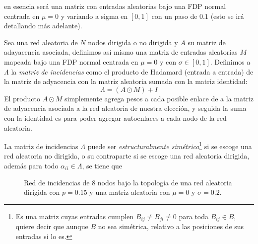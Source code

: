 en esencia será una matriz con entradas aleatorias bajo una FDP normal centrada en $\mu = 0$ y variando a sigma en $[0,1]$ con un paso de $0.1$ (esto se irá detallando más adelante). 
\begin{definición}
	Sea una red aleatoria de $N$ nodos dirigida o no dirigida y $A$ su matriz de adayacencia asociada, definimos así mismo una matriz de entradas aleatorias $M$ mapeada bajo una FDP normal centrada en $\mu=0$ y con $\sigma\in[0,1]$. Definimos a $\Lambda$ la \textit{matriz de incidencias} como el producto de Hadamard (entrada a entrada) de la matriz de adyacencia con la matriz aleatoria sumada con la matriz identidad:
	\begin{equation}\label{eqn:MatrizIncidencias}
		\Lambda=(A\odot M) + I
	\end{equation}
	El producto $A\odot M$ simplemente agrega pesos a cada posible enlace de a la matriz de adyacencia asociada a la red aleatoria de nuestra elección, y seguida la suma con la identidad es para poder agregar autoenlaces a cada nodo de la red aleatoria.
\end{definición}
\setlength{\parindent}{0cm}La matriz de incidencias $\Lambda$ puede ser \textit{estructuralmente simétrica}\footnote{Es una matriz cuyas entradas cumplen $B_{ij}\neq B_{ji}\neq 0$ para toda $B_{ij}\in B$, quiere decir que aunque $B$ no sea simétrica, relativo a las posiciones de sus entradas si lo es.} si se escoge una red aleatoria no dirigida, o su contraparte si se escoge una red aleatoria dirigida, además para todo $\alpha_{ii}\in\Lambda$, se tiene que 
\begin{figure} \vspace{-30pt} \begin{center}
		 
	\end{center} 
	\vspace{-52pt} 
	\caption{Red de incidencias de 8 nodos bajo la topología de una red aleatoria dirigida con $p=0.15$ y una matriz aleatoria con $\mu=0$ y $\sigma=0.2$.} 
	\vspace{-10pt}
	\label{fig:RedIncidencias}
\end{figure} 
